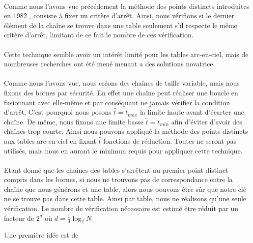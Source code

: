 \paragraph{}Comme nous l'avons vue précédement la méthode des points distincts introduites en 1982 \cite{Rivest}, consiste à fixer un critère d'arrêt. Ainsi, nous vérifions si le dernier élément de la chaîne se trouve dans une table seulement s'il respecte le même critère d'arrêt, limitant de ce fait le nombre de ces vérification.

\paragraph{}Cette technique semble avoir un intérêt limité pour les tables arc-en-ciel, mais de nombreuses recherches ont été mené menant a des solutions novatrice.

\paragraph{}Comme nous l'avons vue, nous créons des chaînes de taille variable, mais nous fixons des bornes par sécurité. En effet une chaîne peut réaliser une boucle en fusionnant avec elle-même et par conséquant ne jamais vérifier la condition d'arrêt. C'est pourquoi nous posons $\hat{t}=t_{max}$ la limite haute avant d'écarter une chaîne. De même, nous fixons une limite basse $\check{t}=t_{min}$ afin d'éviter d'avoir des chaînes trop courte.
	Ainsi nous pouvons appliqué la méthode des points distincts aux tables arc-en-ciel en fixant $\hat{t}$ fonctions de réduction. Toutes ne seront pas utilisés, mais nous en auront le minimun requis pour appliquer cette technique.

\paragraph{}Etant donné que les chaînes des tables s'arrêtent au premier point distinct compris dans les bornes, si nous ne trouvons pas de correspondance entre la chaîne que nous générons et une table, alors nous pouvons être sûr que notre clé ne se trouve pas dans cette table. Ainsi par table, nous ne réalisons qu'une seule vérification. Le nombre de vérification nécessaire est estimé être réduit par un facteur de $2^d$ où $d=\frac{1}{3}\log_2 N$

	Une première idée est de 
	
\endinput{}
